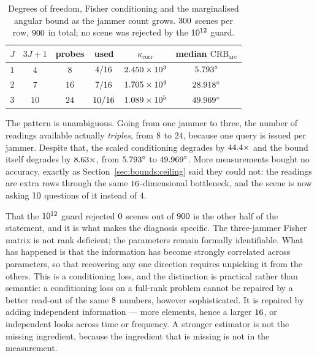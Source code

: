 \documentclass[journal]{IEEEtran}
\newcommand{\CRB}{\mathrm{CRB}}
\newcommand{\degs}{^\circ}
\begin{document}
\begin{table}[!t]
\centering
\caption{Degrees of freedom, Fisher conditioning and the marginalised angular
bound as the jammer count grows. $300$ scenes per row,
$900$ in total; no scene was rejected by the $10^{12}$ guard.}
\label{tab:cond}
\begin{tabular}{@{}cccccc@{}}
\toprule
$J$ & $3J{+}1$ & probes & used & $\kappa_{\mathrm{corr}}$ &
median $\CRB_{\mathrm{arc}}$ \\
\midrule
$1$ & $4$  & $8$  & $4/16$  & $2.450\times10^{3}$   & $\crbMedOneJ\degs$ \\
$2$ & $7$  & $16$ & $7/16$  & $1.705\times10^{4}$   & $\crbMedTwoJ\degs$ \\
$3$ & $10$ & $24$ & $10/16$ & $1.089\times10^{5}$ & $\crbMedThreeJ\degs$ \\
\bottomrule
\end{tabular}
\end{table}

The pattern is unambiguous. Going from one jammer to three, the number of
readings available actually \emph{triples}, from $8$ to $24$, because
one query is issued per jammer. Despite that, the scaled conditioning degrades
by $44.4\times$ and the bound itself degrades by $8.63\times$,
from $\crbMedOneJ\degs$ to $\crbMedThreeJ\degs$. More measurements bought no
accuracy, exactly as Section~\ref{sec:bounds:ceiling} said they could not: the
readings are extra rows through the same $16$-dimensional bottleneck, and
the scene is now asking $10$ questions of it instead of $4$.

That the $10^{12}$ guard rejected $0$ scenes out of $900$ is
the other half of the statement, and it is what makes the diagnosis specific.
The three-jammer Fisher matrix is not rank deficient; the parameters remain
formally identifiable. What has happened is that the information has become
strongly correlated across parameters, so that recovering any one direction
requires unpicking it from the others. This is a conditioning loss, and the
distinction is practical rather than semantic: a conditioning loss on a
full-rank problem cannot be repaired by a better read-out of the same
$8$ numbers, however sophisticated. It is repaired by adding
independent information --- more elements, hence a larger $16$, or
independent looks across time or frequency. A stronger estimator is not the
missing ingredient, because the ingredient that is missing is not in the
measurement.
\end{document}

